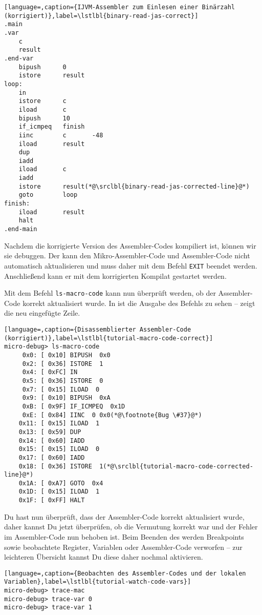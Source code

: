 \begin{lstlisting}[language=,caption={IJVM-Assembler zum Einlesen einer Binärzahl (korrigiert)},label=\lstlbl{binary-read-jas-correct}]
.main
.var
    c
    result
.end-var
    bipush      0
    istore      result
loop:
    in
    istore      c
    iload       c
    bipush      10
    if_icmpeq   finish
    iinc        c       -48
    iload       result
    dup
    iadd
    iload       c
    iadd
    istore      result(*@\srclbl{binary-read-jas-corrected-line}@*)
    goto        loop
finish:
    iload       result
    halt
.end-main
\end{lstlisting}

Nachdem die korrigierte Version des Assembler-Codes kompiliert ist, können wir sie debuggen. Der \md{} kann den Mikro-Assembler-Code und Assembler-Code nicht automatisch aktualisieren und muss daher mit dem Befehl \texttt{EXIT} beendet werden. Anschließend kann er mit dem korrigierten Kompilat gestartet werden.

Mit dem Befehl \texttt{ls-macro-code} kann nun überprüft werden, ob der Assembler-Code korrekt aktualisiert wurde. In  ist die Ausgabe des Befehls zu sehen --  zeigt die neu eingefügte Zeile.

\begin{lstlisting}[language=,caption={Disassemblierter Assembler-Code (korrigiert)},label=\lstlbl{tutorial-macro-code-correct}]
micro-debug> ls-macro-code
     0x0: [ 0x10] BIPUSH  0x0
     0x2: [ 0x36] ISTORE  1
     0x4: [ 0xFC] IN 
     0x5: [ 0x36] ISTORE  0
     0x7: [ 0x15] ILOAD  0
     0x9: [ 0x10] BIPUSH  0xA
     0xB: [ 0x9F] IF_ICMPEQ  0x1D
     0xE: [ 0x84] IINC  0 0x0(*@\footnote{Bug \#37}@*)
    0x11: [ 0x15] ILOAD  1
    0x13: [ 0x59] DUP 
    0x14: [ 0x60] IADD 
    0x15: [ 0x15] ILOAD  0
    0x17: [ 0x60] IADD 
    0x18: [ 0x36] ISTORE  1(*@\srclbl{tutorial-macro-code-corrected-line}@*)
    0x1A: [ 0xA7] GOTO  0x4
    0x1D: [ 0x15] ILOAD  1
    0x1F: [ 0xFF] HALT 
\end{lstlisting}

Du hast nun überprüft, dass der Assembler-Code korrekt aktualisiert wurde, daher kannst Du jetzt überprüfen, ob die Vermutung korrekt war und der Fehler im Assembler-Code nun behoben ist. Beim Beenden des \md{} werden Breakpoints sowie beobachtete Register, Variablen oder Assembler-Code verworfen -- zur leichteren Übersicht kannst Du diese daher nochmal aktivieren.

\begin{lstlisting}[language=,caption={Beobachten des Assembler-Codes und der lokalen Variablen},label=\lstlbl{tutorial-watch-code-vars}]
micro-debug> trace-mac
micro-debug> trace-var 0
micro-debug> trace-var 1
\end{lstlisting}

